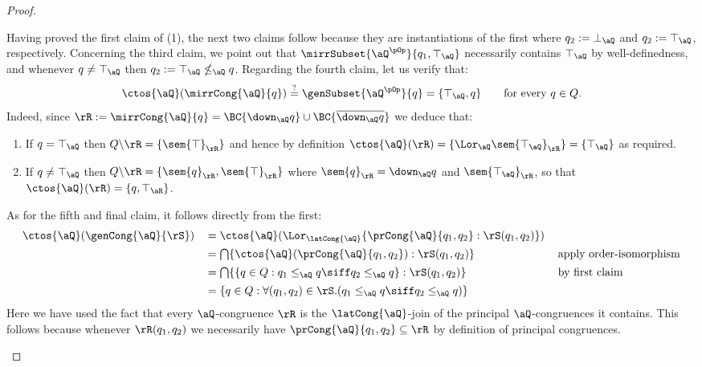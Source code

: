 \documentclass{article}
\begin{document}
\begin{proof}
\begin{enumerate}
\begin{enumerate}
\end{enumerate}

Having proved the first claim of (1), the next two claims follow because they are instantiations of the first where $q_2 := \bot_\aQ$ and $q_2 := \top_\aQ$, respectively. Concerning the third claim, we point out that $\mirrSubset{\aQ^{\pOp}}{q_1,\top_\aQ}$ necessarily contains $\top_\aQ$ by well-definedness, and whenever $q \neq \top_\aQ$ then $q_2 := \top_\aQ \nleq_\aQ q$. Regarding the fourth claim, let us verify that:
\[
\ctos{\aQ}(\mirrCong{\aQ}{q}) \stackrel{?}{=} \genSubset{\aQ^{\pOp}}{q} = \{ \top_\aQ, q \}
\qquad
\text{for every $q \in Q$.}
\]
Indeed, since $\rR := \mirrCong{\aQ}{q} = \BC{\down_\aQ q} \cup \BC{\overline{\down_\aQ q}}$ we deduce that:
\begin{enumerate}
\item
If $q = \top_\aQ$ then $Q\backslash\rR = \{ \sem{\top}_\rR \}$ and hence by definition $\ctos{\aQ}(\rR) = \{ \Lor_\aQ \sem{\top_\aQ}_\rR \} = \{ \top_\aQ \}$ as required.
\item
If $q \neq \top_\aQ$ then $Q\backslash\rR = \{ \sem{q}_\rR, \sem{\top}_\rR \}$ where $\sem{q}_\rR = \down_\aQ q$ and $\sem{\top_\aQ}_\rR$, so that $\ctos{\aQ}(\rR) = \{ q, \top_\aR \}$.
\end{enumerate}

As for the fifth and final claim, it follows directly from the first:
\[
\begin{tabular}{lll}
$\ctos{\aQ}(\genCong{\aQ}{\rS})$
&
$= \ctos{\aQ}(\Lor_{\latCong{\aQ}} \{ \prCong{\aQ}{q_1,q_2} : \rS(q_1,q_2)\} )$
\\[1ex]&
$= \bigcap \{ \ctos{\aQ}(\prCong{\aQ}{q_1,q_2}) : \rS(q_1,q_2) \}$
& apply order-isomorphism
\\[1ex]&
$= \bigcap \{ \{ q \in Q : q_1 \leq_\aQ q \siff q_2 \leq_\aQ q  \} : \rS(q_1,q_2) \}$
& by first claim
\\[1ex]&
$= \{ q \in Q : \forall (q_1,q_2) \in \rS.( q_1 \leq_\aQ q \siff q_2 \leq_\aQ q) \}$
\end{tabular}
\]
Here we have used the fact that every $\aQ$-congruence $\rR$ is the $\latCong{\aQ}$-join of the principal $\aQ$-congruences it contains. This follows because whenever $\rR(q_1,q_2)$ we necessarily have $\prCong{\aQ}{q_1,q_2} \subseteq \rR$ by definition of principal congruences.


\end{enumerate}
\end{proof}
\end{document}

